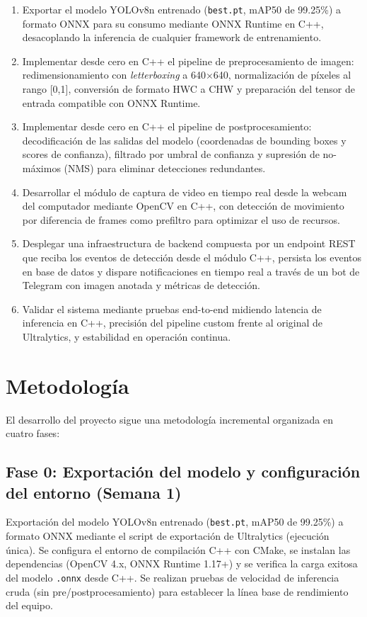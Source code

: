 \documentclass[sigconf,nonacm]{acmart}
\begin{document}
\begin{enumerate}
\item Exportar el modelo YOLOv8n entrenado (\texttt{best.pt}, mAP50 de 99.25\%) a formato ONNX para su consumo mediante ONNX Runtime en C++, desacoplando la inferencia de cualquier framework de entrenamiento.
\item Implementar desde cero en C++ el pipeline de preprocesamiento de imagen: redimensionamiento con \textit{letterboxing} a 640$\times$640, normalización de píxeles al rango [0,1], conversión de formato HWC a CHW y preparación del tensor de entrada compatible con ONNX Runtime.
\item Implementar desde cero en C++ el pipeline de postprocesamiento: decodificación de las salidas del modelo (coordenadas de bounding boxes y scores de confianza), filtrado por umbral de confianza y supresión de no-máximos (NMS) para eliminar detecciones redundantes.
\item Desarrollar el módulo de captura de video en tiempo real desde la webcam del computador mediante OpenCV en C++, con detección de movimiento por diferencia de frames como prefiltro para optimizar el uso de recursos.
\item Desplegar una infraestructura de backend compuesta por un endpoint REST que reciba los eventos de detección desde el módulo C++, persista los eventos en base de datos y dispare notificaciones en tiempo real a través de un bot de Telegram con imagen anotada y métricas de detección.
\item Validar el sistema mediante pruebas end-to-end midiendo latencia de inferencia en C++, precisión del pipeline custom frente al original de Ultralytics, y estabilidad en operación continua.
\end{enumerate}


\section{Metodología}


El desarrollo del proyecto sigue una metodología incremental organizada en cuatro fases:

\subsection{Fase 0: Exportación del modelo y configuración del entorno (Semana 1)}

Exportación del modelo YOLOv8n entrenado (\texttt{best.pt}, mAP50 de 99.25\%) a formato ONNX mediante el script de exportación de Ultralytics (ejecución única). Se configura el entorno de compilación C++ con CMake, se instalan las dependencias (OpenCV 4.x, ONNX Runtime 1.17+) y se verifica la carga exitosa del modelo \texttt{.onnx} desde C++. Se realizan pruebas de velocidad de inferencia cruda (sin pre/postprocesamiento) para establecer la línea base de rendimiento del equipo.
\end{document}
